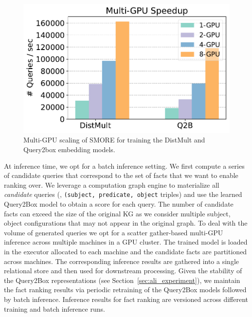 \begin{figure}[t]
\centering
    \includegraphics[width=0.3\columnwidth]{submissions/Ali2023/figures/wiki-speedup.pdf}
    \caption{Multi-GPU scaling of SMORE for training the DistMult and Query2box embedding models.
    }
\label{fig:speedup}
\end{figure}

At inference time, we opt for a batch inference setting. We first compute a series of candidate queries that correspond to the set of facts that we want to enable ranking over. We leverage a computation graph engine to materialize all \emph{candidate} queries (\ie, \texttt{(subject, predicate, object} triples) and use the learned Query2Box model to obtain a score for each query. The number of candidate facts can exceed the size of the original KG as we consider multiple subject, object configurations that may not appear in the original graph. To deal with the volume of generated queries we opt for a scatter gather-based multi-GPU inference across multiple machines in a GPU cluster. The trained model is loaded in the executor allocated to each machine and the candidate facts are partitioned across machines. The corresponding inference results are gathered into a single relational store and then used for downstream processing. Given the stability of the Query2Box representations (see Section~\ref{sec:ali_experiment}), we maintain the fact ranking results via periodic retraining of the Query2Box models followed by batch inference. Inference results for fact ranking are versioned across different training and batch inference runs.

\iffalse


